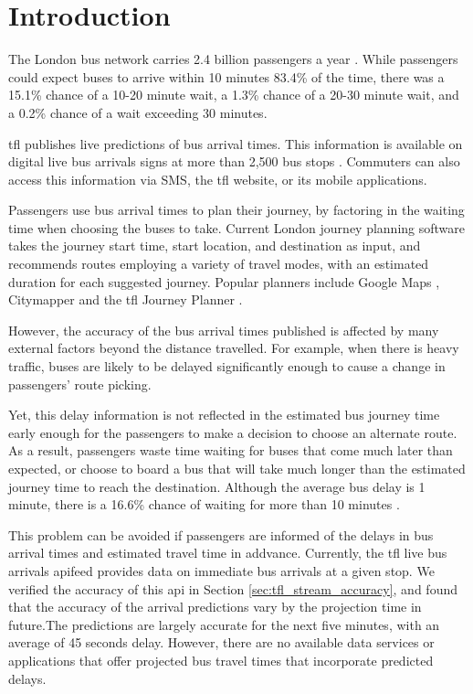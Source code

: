 \chapter{Introduction}

\par The London bus network carries 2.4 billion passengers a year \cite{tfl_annual_report_13/14}. While passengers could expect buses to arrive within 10 minutes 83.4\% of the time, there was a 15.1\% chance of a 10-20 minute wait, a 1.3\% chance of a 20-30 minute wait, and a 0.2\% chance of a wait exceeding 30 minutes.\cite{buses_performance_report}

\par \acrfull{tfl} publishes live predictions of bus arrival times. This information is available on digital live bus arrivals signs at more than 2,500 bus stops \cite{live_bus_arrivals}. Commuters can also access this information via SMS, the \acrshort{tfl} website, or its mobile applications.

\par Passengers use bus arrival times to plan their journey, by factoring in the waiting time when choosing the buses to take. Current London journey planning software takes the journey start time, start location, and destination as input, and recommends routes employing a variety of travel modes, with an estimated duration for each suggested journey. Popular planners include Google Maps \cite{google_maps}, Citymapper \cite{citymapper} and the \acrshort{tfl} Journey Planner \cite{tfl_journey_planner}.
\par However, the accuracy of the bus arrival times published is affected by many external factors beyond the distance travelled. For example, when there is heavy traffic, buses are likely to be delayed significantly enough to cause a change in passengers' route picking.

\par Yet, this delay information is not reflected in the estimated bus journey time early enough for the passengers to make a decision to choose an alternate route. As a result, passengers waste time waiting for buses that come much later than expected, or choose to board a bus that will take much longer than the estimated journey time to reach the destination. Although the average bus delay is 1 minute, there is a 16.6\% chance of waiting for more than 10 minutes \cite{buses_performance_data}.

\par This problem can be avoided if passengers are informed of the delays in bus arrival times and estimated travel time in addvance. Currently, the \acrshort{tfl} live bus arrivals \acrfull{api}feed\cite{live_bus_arrivals} provides data on immediate bus arrivals at a given stop. We verified the accuracy of this \acrshort{api} in Section \ref{sec:tfl_stream_accuracy}, and found that the accuracy of the arrival predictions vary by the projection time in future.The predictions are largely accurate for the next five minutes, with an average of 45 seconds delay. However, there are no available data services or applications that offer projected bus travel times that incorporate predicted delays.

